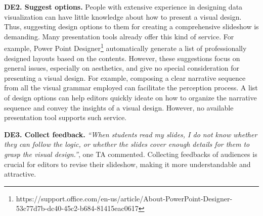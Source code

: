 \textbf{DE2. Suggest options.}
People with extensive experience in designing data visualization can have little knowledge about how to present a visual design. 
Thus, suggesting design options to them for creating a comprehensive slideshow is demanding. Many presentation tools already offer this kind of service. For example, Power Point Designer\footnote{https://support.office.com/en-us/article/About-PowerPoint-Designer-53c77d7b-dc40-45c2-b684-81415eac0617} automatically generate a list of professionally designed layouts based on the contents. However, these suggestions focus on general issues, especially on aesthetics, and give no special consideration for presenting a visual design.
For example, composing a clear narrative sequence from all the visual grammar employed can facilitate the perception process. A list of design options can help editors quickly ideate on how to organize the narrative sequence and convey the insights of a visual design. However, no available presentation tool supports such service. 

\textbf{DE3. Collect feedback.} \textit{``When students read my slides, I do not know whether they can follow the logic, or whether the slides cover enough details for them to grasp the visual design.''}, one TA commented. 
Collecting feedbacks of audiences is crucial for editors to revise their slideshow, making it more understandable and attractive.  


